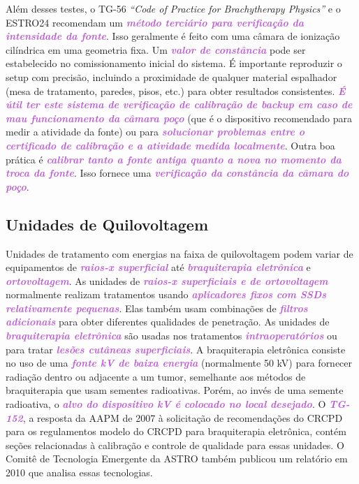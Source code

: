 \documentclass[11pt,a4paper]{article}
\begin{document}
	Além desses testes, o  TG-56 \textit{``Code of Practice for Brachytherapy Physics''} e o ESTRO24 recomendam um \textcolor{MediumOrchid}{\textbf{\textit{método terciário para verificação da intensidade da fonte}}}. Isso geralmente é feito com uma câmara de ionização cilíndrica em uma geometria fixa. Um \textcolor{MediumOrchid}{\textbf{\textit{valor de constância}}} pode ser estabelecido no comissionamento inicial do sistema. É importante reproduzir o setup com precisão, incluindo a proximidade de qualquer material espalhador (mesa de tratamento, paredes, pisos, etc.) para obter resultados consistentes. \textcolor{MediumOrchid}{\textbf{\textit{É útil ter este sistema de verificação de calibração de backup em caso de mau funcionamento da câmara  poço}}} (que é o dispositivo recomendado para medir a atividade da fonte) ou para \textcolor{MediumOrchid}{\textbf{\textit{solucionar problemas entre o certificado de calibração e a atividade medida localmente}}}. Outra boa prática é \textcolor{MediumOrchid}{\textbf{\textit{calibrar tanto a fonte antiga quanto a nova no momento da troca da fonte}}}. Isso fornece uma \textcolor{MediumOrchid}{\textbf{\textit{verificação da constância da câmara do poço}}}.

\subsection*{Unidades de Quilovoltagem}

	Unidades de tratamento com energias na faixa de quilovoltagem podem variar de equipamentos de \textcolor{MediumOrchid}{\textbf{\textit{raios-x superficial}}} até \textcolor{MediumOrchid}{\textbf{\textit{braquiterapia eletrônica}}} e \textcolor{MediumOrchid}{\textbf{\textit{ortovoltagem}}}. As unidades de \textcolor{MediumOrchid}{\textbf{\textit{raios-x superficiais e de ortovoltagem}}} normalmente realizam tratamentos usando \textcolor{MediumOrchid}{\textbf{\textit{aplicadores fixos com SSDs relativamente pequenas}}}. Elas também usam combinações de \textcolor{MediumOrchid}{\textbf{\textit{filtros adicionais}}} para obter diferentes qualidades de penetração. As unidades de \textcolor{MediumOrchid}{\textbf{\textit{braquiterapia eletrônica}}} são usadas nos tratamentos \textcolor{MediumOrchid}{\textbf{\textit{intraoperatórios}}} ou para tratar \textcolor{MediumOrchid}{\textbf{\textit{lesões cutâneas superficiais}}}. A braquiterapia eletrônica consiste no uso de uma \textcolor{MediumOrchid}{\textbf{\textit{fonte kV de baixa energia}}} (normalmente 50 kV) para fornecer radiação dentro ou adjacente a um tumor, semelhante aos métodos de braquiterapia que usam sementes radioativas. Porém, ao invés de uma semente radioativa, o \textcolor{MediumOrchid}{\textbf{\textit{alvo do dispositivo kV é colocado no local desejado}}}. O \textcolor{MediumOrchid}{\textbf{\textit{TG-152}}}, a resposta da AAPM de 2007 à solicitação de recomendações do CRCPD para os regulamentos modelo do CRCPD para braquiterapia eletrônica, contém seções relacionadas à calibração e controle de qualidade para essas unidades. O Comitê de Tecnologia Emergente da ASTRO também publicou um relatório em 2010 que analisa essas tecnologias.
\end{document}

